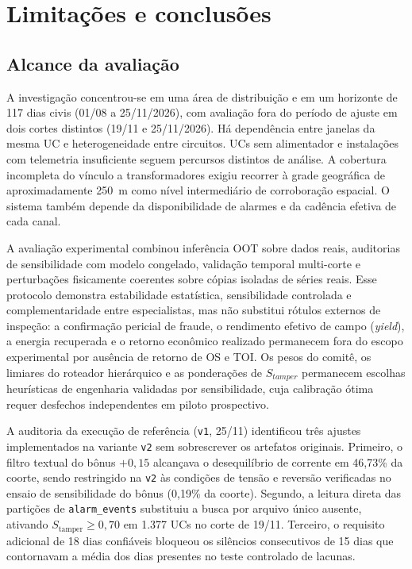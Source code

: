 \chapter{Limitações e conclusões}
\section{Alcance da avaliação}
A investigação concentrou-se em uma área de distribuição e em um horizonte de 117 dias civis (01/08 a 25/11/2026), com avaliação fora do período de ajuste em dois cortes distintos (19/11 e 25/11/2026). Há dependência entre janelas da mesma UC e heterogeneidade entre circuitos. UCs sem alimentador e instalações com telemetria insuficiente seguem percursos distintos de análise. A cobertura incompleta do vínculo a transformadores exigiu recorrer à grade geográfica de aproximadamente 250~m como nível intermediário de corroboração espacial. O sistema também depende da disponibilidade de alarmes e da cadência efetiva de cada canal.

A avaliação experimental combinou inferência OOT sobre dados reais, auditorias de sensibilidade com modelo congelado, validação temporal multi-corte e perturbações fisicamente coerentes sobre cópias isoladas de séries reais. Esse protocolo demonstra estabilidade estatística, sensibilidade controlada e complementaridade entre especialistas, mas não substitui rótulos externos de inspeção: a confirmação pericial de fraude, o rendimento efetivo de campo (\emph{yield}), a energia recuperada e o retorno econômico realizado permanecem fora do escopo experimental por ausência de retorno de OS e TOI. Os pesos do comitê, os limiares do roteador hierárquico e as ponderações de $S_{tamper}$ permanecem escolhas heurísticas de engenharia validadas por sensibilidade, cuja calibração ótima requer desfechos independentes em piloto prospectivo.

A auditoria da execução de referência (\texttt{v1}, 25/11) identificou três ajustes implementados na variante \texttt{v2} sem sobrescrever os artefatos originais. Primeiro, o filtro textual do bônus $+0{,}15$ alcançava o desequilíbrio de corrente em 46,73\% da coorte, sendo restringido na \texttt{v2} às condições de tensão e reversão verificadas no ensaio de sensibilidade do bônus (0,19\% da coorte). Segundo, a leitura direta das partições de \texttt{alarm\_events} substituiu a busca por arquivo único ausente, ativando $S_{\text{tamper}} \ge 0{,}70$ em 1.377 UCs no corte de 19/11. Terceiro, o requisito adicional de 18 dias confiáveis bloqueou os silêncios consecutivos de 15 dias que contornavam a média dos dias presentes no teste controlado de lacunas.

